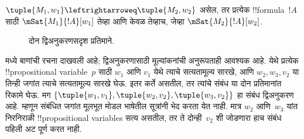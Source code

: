 \documentclass[../../../include/open-logic-section]{subfiles}
\begin{document}
\begin{thm}
$\tuple{M_1, w_1} \leftrightarroweq \tuple{M_2, w_2}$
असेल, तर प्रत्येक !!{formula}~$!A$ साठी
$\mSat{M_1}{!A}[w_1]$ तेव्हा आणि केवळ तेव्हाच,
जेव्हा $\mSat{M_2}{!A}[w_2]$.
\end{thm}

\begin{figure}
  \begin{center}
  \end{center}
  \caption{दोन द्विअनुकरणसदृश प्रतिमाने.}
\end{figure}

 मध्ये बाणांची रचना दाखवली आहे;
द्विअनुकरणासाठी मूल्यांकनांची अनुरूपताही आवश्यक आहे.
येथे प्रत्येक !!{propositional variable}~$p$ साठी
$w_1$ आणि $v_1$ येथे त्याचे सत्यतामूल्य सारखे,
आणि $w_2,w_3,v_2$ या तिन्ही जगांत त्याचे सत्यतामूल्य
सारखे घेऊ. इतर कर्ते असतील, तर त्यांचे संबंध या
दोन प्रतिमानांत रिकामे घेऊ. मग
$\{\tuple{w_1,v_1},\tuple{w_2,v_2},\tuple{w_3,v_2}\}$
हा संबंध द्विअनुकरण आहे. म्हणून संबंधित जगांत मूलभूत
मोडल भाषेतील सूत्रांनी भेद करता येत नाही. मात्र
$w_2$ आणि~$w_3$ यांत निरनिराळी !!{propositional variable}s
सत्य असतील, तर ते दोन्ही~$v_2$ शी जोडणारा हाच
संबंध पहिली अट पूर्ण करत नाही.
\end{document}

